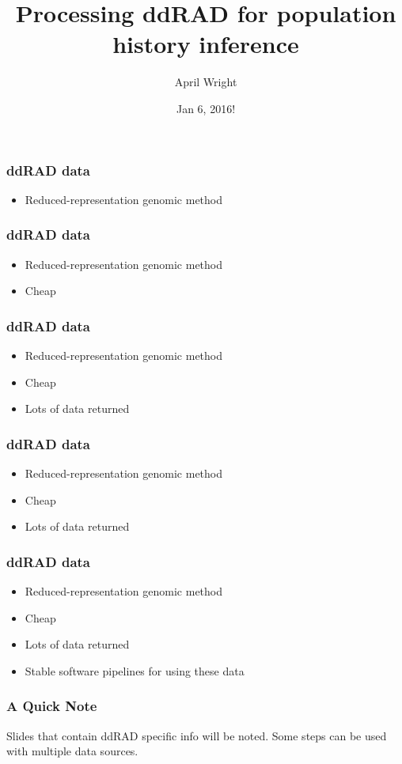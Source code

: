 \documentclass{beamer}
\title{Processing ddRAD for population history inference}
\author{April Wright}
\institute{ISU, KU}
\date{Jan 6, 2016!}
\begin{document}
 
\frame{\titlepage}
 
\begin{frame}
\frametitle{ddRAD data}
\begin{itemize}
\item Reduced-representation genomic method
\end{itemize}
\end{frame}

\begin{frame}
\frametitle{ddRAD data}
\begin{itemize}
\item Reduced-representation genomic method
\item Cheap
\end{itemize}
\end{frame}

\begin{frame}
\frametitle{ddRAD data}
\begin{itemize}
\item Reduced-representation genomic method
\item Cheap
\item Lots of data returned
\end{itemize}
\end{frame}

\begin{frame}
\frametitle{ddRAD data}
\begin{itemize}
\item Reduced-representation genomic method
\item Cheap
\item Lots of data returned
\end{itemize}
\end{frame}
 
\begin{frame}
\frametitle{ddRAD data}
\begin{itemize}
\item Reduced-representation genomic method
\item Cheap
\item Lots of data returned
\item Stable software pipelines for using these data
\end{itemize}
\end{frame}

\begin{frame}
\frametitle{A Quick Note}
Slides that contain ddRAD specific info will be noted. Some steps can be used with multiple data sources.
\end{frame}
\end{document}
